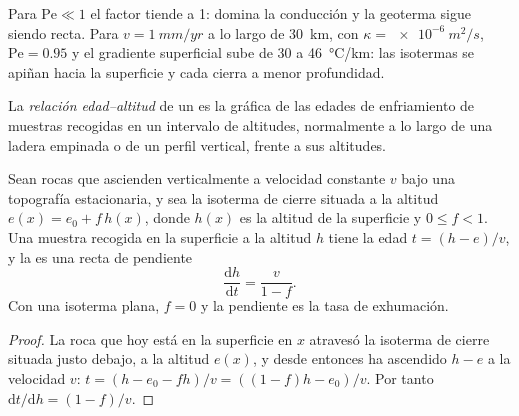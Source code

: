 Para $\mathrm{Pe} \ll 1$ el factor tiende a 1: domina la conducción y la
geoterma sigue siendo recta. Para $v = \qty{1}{mm/yr}$ a lo largo de \qty{30}{km}, con
$\kappa = \qty{e-6}{m^2/s}$, $\mathrm{Pe} = 0.95$ y el gradiente superficial
sube de 30 a \qty{46}{\celsius/km}: las isotermas se apiñan hacia la
superficie y cada  cierra a menor profundidad.

\begin{definition}\label{def:b3:orogenic-wedges:age-elevation}
La \emph{relación edad--altitud} de un
 es la gráfica de las edades de enfriamiento de muestras recogidas en un
intervalo de altitudes, normalmente a lo largo de una ladera empinada o de un perfil vertical,
frente a sus altitudes.
\end{definition}

\begin{proposition}\label{prop:b3:orogenic-wedges:age-elevation}
Sean rocas que ascienden verticalmente a velocidad constante $v$ bajo una
topografía estacionaria, y sea la isoterma de cierre situada a la altitud $e(x) = e_0 +
f\,h(x)$, donde $h(x)$ es la altitud de la superficie y $0 \le f < 1$. Una muestra
recogida en la superficie a la altitud $h$ tiene la edad $t = (h - e)/v$,
y la  es una recta de pendiente
\[
  \frac{\mathrm dh}{\mathrm dt} = \frac{v}{1 - f}.
\]
Con una isoterma plana, $f = 0$ y la pendiente es la tasa de exhumación.
\end{proposition}

\begin{proof}
La roca que hoy está en la superficie en $x$ atravesó la isoterma de cierre situada justo
debajo, a la altitud $e(x)$, y desde entonces ha ascendido $h - e$ a la velocidad $v$:
$t = (h - e_0 - fh)/v = ((1 - f)h - e_0)/v$. Por tanto $\mathrm dt/\mathrm dh =
(1 - f)/v$.
\end{proof}

